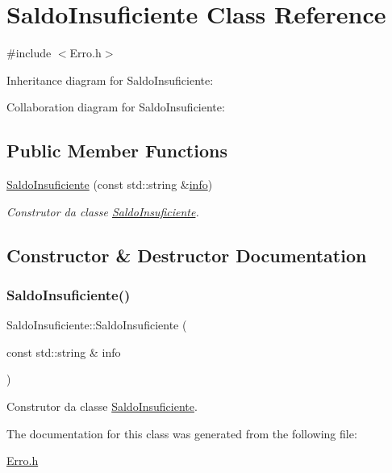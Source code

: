 \hypertarget{class_saldo_insuficiente}{}\section{Saldo\+Insuficiente Class Reference}
\label{class_saldo_insuficiente}


{\ttfamily \#include $<$Erro.\+h$>$}



Inheritance diagram for Saldo\+Insuficiente\+:


Collaboration diagram for Saldo\+Insuficiente\+:
\subsection*{Public Member Functions}
\begin{DoxyCompactItemize}
\item 
\mbox{\hyperlink{class_saldo_insuficiente_aacd4d88be6fe190105bf122355d72df4}{Saldo\+Insuficiente}} (const std\+::string \&\mbox{\hyperlink{class_erro_a3ecaaf6f8e15a0830a648035b456cb62}{info}})
\begin{DoxyCompactList}\small\item\em Construtor da classe \mbox{\hyperlink{class_saldo_insuficiente}{Saldo\+Insuficiente}}. \end{DoxyCompactList}\end{DoxyCompactItemize}


\subsection{Constructor \& Destructor Documentation}
\mbox{\label{class_saldo_insuficiente_aacd4d88be6fe190105bf122355d72df4}} 
\subsubsection{\texorpdfstring{Saldo\+Insuficiente()}{SaldoInsuficiente()}}
{\footnotesize\ttfamily Saldo\+Insuficiente\+::\+Saldo\+Insuficiente (\begin{DoxyParamCaption}\item[{const std\+::string \&}]{info }\end{DoxyParamCaption})\hspace{0.3cm}{\ttfamily [inline]}}



Construtor da classe \mbox{\hyperlink{class_saldo_insuficiente}{Saldo\+Insuficiente}}. 



The documentation for this class was generated from the following file\+:\begin{DoxyCompactItemize}
\item 
\mbox{\hyperlink{_erro_8h}{Erro.\+h}}\end{DoxyCompactItemize}
